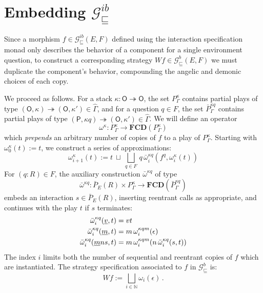 \documentclass[11pt,oneside,draft]{book}
\theoremstyle{definition}
\newcommand{\gcat}{\mathcal{G}_{\sqsubseteq}}
\newcommand{\kw}[1]{\ensuremath{ \mathsf{#1} }}
\newcommand{\ul}[1]{%
  \underline{\smash{#1}}
}
\begin{document}

\section{Embedding $\gcat^{ib}$} \label{sec:gamesem:emb} %

Since a morphism $f \in \gcat^{ib}(E,F)$
defined using the interaction specification monad
only describes the behavior of a component
for a single environment question,
to construct a corresponding strategy $W f \in \gcat^b(E,F)$
we must duplicate the component's behavior,
compounding the angelic and demonic choices of each copy.

We proceed as follows.
For a stack
$\kappa : \kw{O} \twoheadrightarrow \kw{O}$,
the set $P^\kappa_\Gamma$ contains
partial plays of type
$(\kw{O}, \kappa) \twoheadrightarrow (\kw{O}, \kappa')
 \in \hat{\Gamma}$,
and for a question $q \in F$,
the set $\bar{P}^{\kappa q}_\Gamma$ contains
partial plays of type
$(\kw{P}, \kappa q) \twoheadrightarrow (\kw{O}, \kappa')
 \in \hat{\Gamma}$.
We will define an operator
\[
  \omega^\kappa :
    P^\kappa_\Gamma \rightarrow
    \mathbf{FCD}(P^\kappa_\Gamma)
\]
which \emph{prepends} an arbitrary number of copies of $f$
to a play of $P^\kappa_\Gamma$.
Starting with
$\omega^\kappa_0(t) := t$,
we construct a series of approximations:
\[
  \omega^\kappa_{i+1}(t) :=
    t \: \sqcup \:
    \bigsqcup_{q \in F} \,
      q \, \bar{\omega}^{\kappa q}_i(f^q, \omega^\kappa_i(t))
\]
For $(q \mathbin: R) \in F$,
the auxiliary construction $\bar{\omega}^{\kappa q}$ of type
\[
  \bar{\omega}^{\kappa q} :
    \bar{P}_E(R) \times P^{\kappa}_\Gamma \rightarrow
    \mathbf{FCD}(\bar{P}^{\kappa q}_\Gamma)
\]
embeds an interaction $s \in \bar{P}_E(R)$,
inserting reentrant calls as appropriate,
and continues with the play $t$
if $s$ terminates:
\begin{align*}
  \bar{\omega}^{\kappa q}_i(\ul v, t) &=
    v t
  \\
  \bar{\omega}^{\kappa q}_i(\ul m, t) &=
    m \, \omega^{\kappa q m}_i(\epsilon)
  \\
  \bar{\omega}^{\kappa q}_i(\ul m n s, t) &=
    m \, \omega^{\kappa q m}_i(n \, \bar{\omega}^{\kappa q}_i(s, t))
\end{align*}
The index $i$ limits both the number of
sequential and reentrant copies of $f$
which are instantiated.
The strategy specification associated to $f$
in $\gcat^{b}$ is:
\[
    W f := \bigsqcup_{i \in \mathbb{N}} \omega_i(\epsilon) \,.
\]

\end{document}
